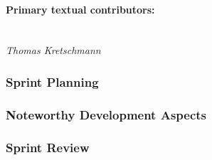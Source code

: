 \paragraph{Primary textual contributors:}
\mbox{}\\\emph{Thomas Kretschmann}

\subsubsection{Sprint Planning}


\subsubsection{Noteworthy Development Aspects}


\subsubsection{Sprint Review}


